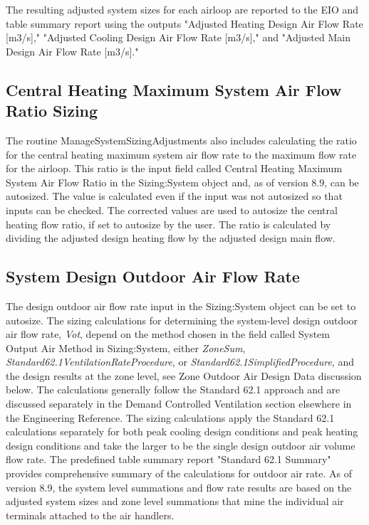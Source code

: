 The resulting adjusted system sizes for each airloop are reported to the EIO and table summary report using the outputs "Adjusted Heating Design Air Flow Rate [m3/s]," "Adjusted Cooling Design Air Flow Rate [m3/s]," and "Adjusted Main Design Air Flow Rate [m3/s]."

\subsection{Central Heating Maximum System Air Flow Ratio Sizing}\label{central-heating-maximum-system-air-flow-ratio-sizing}

The routine ManageSystemSizingAdjustments also includes calculating the ratio for the central heating maximum system air flow rate to the maximum flow rate for the airloop.  This ratio is the input field called Central Heating Maximum System Air Flow Ratio in the Sizing:System object and, as of version 8.9, can be autosized.  The value is calculated even if the input was not autosized so that inputs can be checked.  The corrected values are used to autosize the central heating flow ratio, if set to autosize by the user. The ratio is calculated by dividing the adjusted design heating flow by the adjusted design main flow. 

\subsection{System Design Outdoor Air Flow Rate}\label{Design-Outdoor-Air-Flow-Rate}

The design outdoor air flow rate input in the Sizing:System object can be set to autosize. The sizing calculations for determining the system-level design outdoor air flow rate, \emph{Vot}, depend on the method chosen in the field called System Output Air Method in Sizing:System, either \emph{ZoneSum}, \emph{Standard62.1VentilationRateProcedure}, or \emph{Standard62.1SimplifiedProcedure}, and the design results at the zone level, see Zone Outdoor Air Design Data discussion below. The calculations generally follow the Standard 62.1 approach and are discussed separately in the Demand Controlled Ventilation section elsewhere in the Engineering Reference. The sizing calculations apply the Standard 62.1 calculations separately for both peak cooling design conditions and peak heating design conditions and take the larger to be the single design outdoor air volume flow rate. The predefined table summary report "Standard 62.1 Summary" provides comprehensive summary of the calculations for outdoor air rate.  As of version 8.9, the system level summations and flow rate results are based on the adjusted system sizes and zone level summations that mine the individual air terminals attached to the air handlers.



